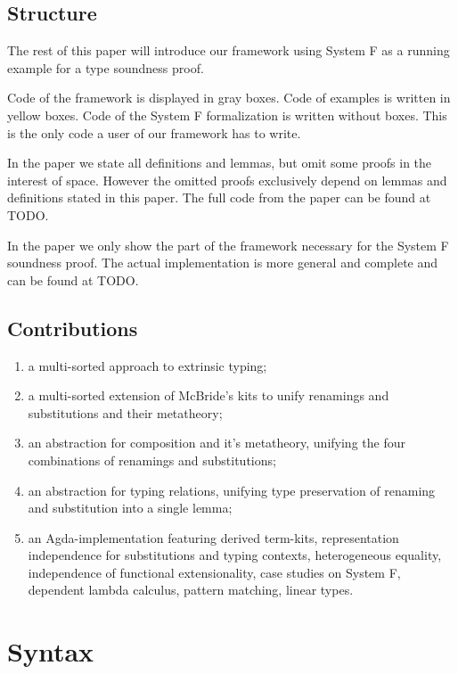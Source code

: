 \documentclass[sigplan,10pt, anonymous]{acmart}
\begin{document}
  \subsection{Structure}
  The rest of this paper will introduce our framework using System F
  as a running example for a type soundness proof.

  Code of the framework is displayed in gray boxes.
  Code of examples is written in yellow boxes.
  Code of the System F formalization is written without boxes. This is
  the only code a user of our framework has to write.

  In the paper we state all definitions and lemmas, but omit some proofs
  in the interest of space. However the omitted proofs exclusively
  depend on lemmas and definitions stated in this paper. The full code
  from the paper can be found at TODO.

  In the paper we only show the part of the framework necessary for
  the System F soundness proof. The actual implementation is more
  general and complete and can be found at TODO.

  \subsection{Contributions}
  \begin{enumerate}
  \item
    a multi-sorted approach to extrinsic typing;
  \item
    a multi-sorted extension of McBride's kits to unify renamings and substitutions and their metatheory;
  \item
    an abstraction for composition and it's metatheory, unifying the four combinations of renamings and substitutions;
  \item
    an abstraction for typing relations, unifying type preservation of renaming and substitution into a single lemma;
  \item
    an Agda-implementation featuring derived term-kits, representation
    independence for substitutions and typing contexts, heterogeneous
    equality, independence of functional extensionality, case studies
    on System F, dependent lambda calculus, pattern matching, linear
    types.
  \end{enumerate}

  \newpage

  \section{Syntax}
\end{document}
